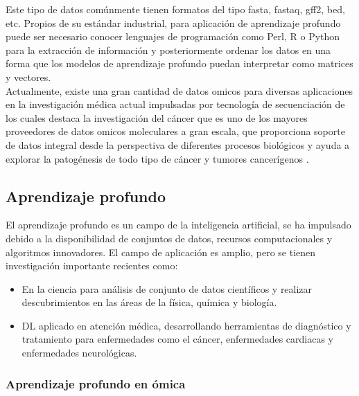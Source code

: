 Este tipo de datos comúnmente tienen formatos del tipo fasta, fastaq, gff2, bed, etc. Propios de su estándar industrial, para aplicación de aprendizaje profundo puede ser necesario conocer lenguajes de programación como Perl, R o Python para la extracción de información y posteriormente ordenar los datos en una forma que los modelos de aprendizaje profundo puedan interpretar como matrices y vectores.\\

Actualmente, existe una gran cantidad de datos omicos para diversas aplicaciones en la investigación médica actual impulsadas por tecnología de secuenciación de los cuales destaca la investigación del cáncer que es uno de los mayores proveedores de datos omicos moleculares a gran escala, que proporciona soporte de datos integral desde la perspectiva de diferentes procesos biológicos y ayuda a explorar la patogénesis de todo tipo de cáncer y tumores cancerígenos \citep{li2024avbae}.

\subsection{Aprendizaje profundo}

El aprendizaje profundo es un campo de la inteligencia artificial, se ha impulsado debido a la disponibilidad de conjuntos de datos, recursos computacionales y algoritmos innovadores. El campo de aplicación es amplio, pero se tienen investigación importante recientes como:\\

\begin{itemize}

   \addtolength{\itemsep}{-4mm} %
        \item En la ciencia para análisis de conjunto de datos científicos y realizar descubrimientos en las áreas de la física, química y biología.

        \item DL aplicado en atención médica, desarrollando herramientas de diagnóstico y tratamiento para enfermedades como el cáncer, enfermedades cardiacas y enfermedades neurológicas.\\

    \end{itemize}

\subsubsection{Aprendizaje profundo en ómica}

